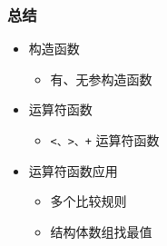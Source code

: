 


\begin{frame}[fragile]
    \frametitle{总结}

    \begin{itemize}
        \item 构造函数
        
        \begin{itemize}
            \item 有、无参构造函数
        \end{itemize}

        \item 运算符函数
        
        \begin{itemize}
            \item \lstinline|<、>、+| 运算符函数
        \end{itemize}

        \item 运算符函数应用
        
        \begin{itemize}
            \item 多个比较规则
            \item 结构体数组找最值
        \end{itemize}

    \end{itemize}
            
\end{frame}

% 


